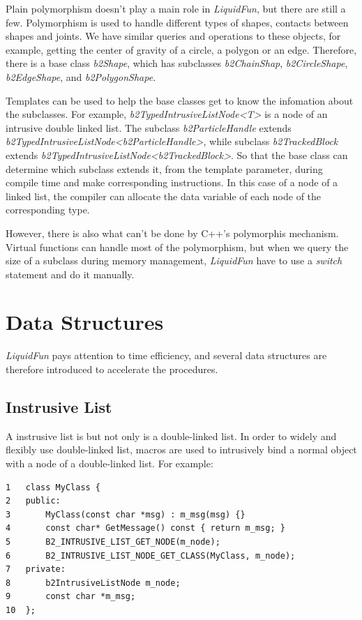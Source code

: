 \documentclass[UTF8]{ctexart}
\begin{document}
            Plain polymorphism doesn't play a main role in \textit{LiquidFun}, but there are still a few. Polymorphism is used to handle different types of shapes, contacts between shapes and joints. We have similar queries and operations to these objects, for example, getting the center of gravity of a circle, a polygon or an edge. Therefore, there is a base class \textit{b2Shape}, which has subclasses \textit{b2ChainShap}, \textit{b2CircleShape}, \textit{b2EdgeShape}, and \textit{b2PolygonShape}.

            Templates can be used to help the base classes get to know the infomation about the subclasses. For example, \textit{b2TypedIntrusiveListNode<T>} is a node of an intrusive double linked list. The subclass \textit{b2ParticleHandle} extends \textit{b2TypedIntrusiveListNode<b2ParticleHandle>}, while subclass \textit{b2TrackedBlock} extends \textit{b2TypedIntrusiveListNode<b2TrackedBlock>}. So that the base class can determine which subclass extends it, from the template parameter, during compile time and make corresponding instructions. In this case of a node of a linked list, the compiler can allocate the data variable of each node of the corresponding type.

            However, there is also what can't be done by C++'s polymorphis mechanism. Virtual functions can handle most of the polymorphism, but when we query the size of a subclass during memory management, \textit{LiquidFun} have to use a \textit{switch} statement and do it manually.

    \section{Data Structures}

        \textit{LiquidFun} pays attention to time efficiency, and several data structures are therefore introduced to accelerate the procedures.

        \subsection{Instrusive List}

            A instrusive list is but not only is a double-linked list. In order to widely and flexibly use double-linked list, macros are used to intrusively bind a normal object with a node of a double-linked list. For example:

            \begin{verbatim}
1   class MyClass {
2   public:
3       MyClass(const char *msg) : m_msg(msg) {}
4       const char* GetMessage() const { return m_msg; }
5       B2_INTRUSIVE_LIST_GET_NODE(m_node);
6       B2_INTRUSIVE_LIST_NODE_GET_CLASS(MyClass, m_node);
7   private:
8       b2IntrusiveListNode m_node;
9       const char *m_msg;
10  };
            \end{verbatim}
\end{document}
